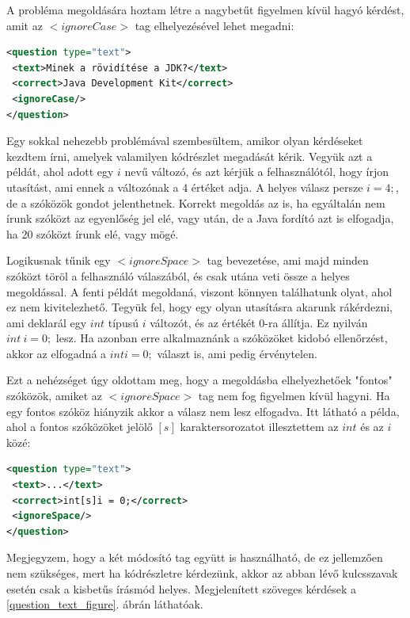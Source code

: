 \documentclass[12pt,a4paper]{article}
\begin{document}
	A probléma megoldására hoztam létre a nagybetűt figyelmen kívül hagyó kérdést, amit az $<ignoreCase>$ tag elhelyezésével lehet megadni:
	
	\begin{lstlisting}[language=XML]	
<question type="text">
 <text>Minek a rövidítése a JDK?</text>
 <correct>Java Development Kit</correct>
 <ignoreCase/>
</question>
	\end{lstlisting}
	
	\noindent
	Egy sokkal nehezebb problémával szembesültem, amikor olyan kérdéseket kezdtem írni, amelyek valamilyen kódrészlet megadását kérik. Vegyük azt a példát, ahol adott egy $i$ nevű változó, és azt kérjük a felhasználótól, hogy írjon utasítást, ami ennek a változónak a $4$ értéket adja. A helyes válasz persze $i = 4;$, de a szóközök gondot jelenthetnek. Korrekt megoldás az is, ha egyáltalán nem írunk szóközt az egyenlőség jel elé, vagy után, de a Java fordító azt is elfogadja, ha 20 szóközt írunk elé, vagy mögé.
	
	Logikusnak tűnik egy $<ignoreSpace>$ tag bevezetése, ami majd minden szóközt töröl a felhasználó válaszából, és csak utána veti össze a helyes megoldással. A fenti példát megoldaná, viszont könnyen találhatunk olyat, ahol ez nem kivitelezhető. Tegyük fel, hogy egy olyan utasításra akarunk rákérdezni, ami deklarál egy $int$ típusú $i$ változót, és az értékét $0$-ra állítja. Ez nyilván $int \ i = 0;$ lesz. Ha azonban erre alkalmaznánk a szóközöket kidobó ellenőrzést, akkor az elfogadná a $inti=0;$ választ is, ami pedig érvénytelen.
	
	Ezt a nehézséget úgy oldottam meg, hogy a megoldásba elhelyezhetőek "fontos" szóközök, amiket az $<ignoreSpace>$ tag nem fog figyelmen kívül hagyni. Ha egy fontos szóköz hiányzik akkor a válasz nem lesz elfogadva. Itt látható a példa, ahol a fontos szóközöket jelölő $[s]$ karaktersorozatot illesztettem az $int$ és az $i$ közé:
	
	\begin{lstlisting}[language=XML]	
<question type="text">
 <text>...</text>
 <correct>int[s]i = 0;</correct>
 <ignoreSpace/>
</question>
	\end{lstlisting}
	
	\noindent
	Megjegyzem, hogy a két módosító tag együtt is használható, de ez jellemzően nem szükséges, mert ha kódrészletre kérdezünk, akkor az abban lévő kulcsszavak esetén csak a kisbetűs írásmód helyes. Megjelenített szöveges kérdések a \ref{question_text_figure}. ábrán láthatóak.
	
\end{document}
